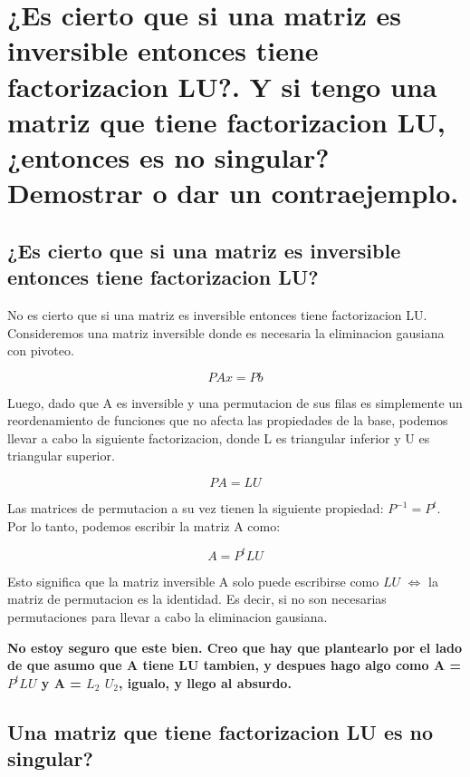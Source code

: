 \documentclass[10pt,a4paper]{article}
\begin{document}
\section{¿Es cierto que si una matriz es inversible entonces tiene factorizacion LU?. Y si tengo una matriz que tiene factorizacion LU, ¿entonces es no singular? Demostrar o dar un contraejemplo.}

\subsection{¿Es cierto que si una matriz es inversible entonces tiene factorizacion LU?}

No es cierto que si una matriz es inversible entonces tiene factorizacion LU. Consideremos una matriz inversible  donde es necesaria la eliminacion gausiana con pivoteo.

\begin{equation}
PAx = Pb
\end{equation}

Luego, dado que A es inversible y una permutacion de sus filas es simplemente un reordenamiento de funciones que no afecta las propiedades de la base, podemos llevar a cabo la siguiente factorizacion, donde L es triangular inferior y U es triangular superior.

\begin{equation}
PA = LU
\end{equation}

Las matrices de permutacion a su vez tienen la siguiente propiedad: $P^{-1} = P^t$. Por lo tanto, podemos escribir la matriz A como:

\begin{equation}
A = P^tLU
\end{equation}

Esto significa que la matriz inversible A solo puede escribirse como $LU$ $\iff$ la matriz de permutacion es la identidad. Es decir, si no son necesarias permutaciones para  llevar a cabo la eliminacion gausiana.

\textbf{No estoy seguro que este bien. Creo que hay que plantearlo por el lado de que asumo que A tiene LU tambien, y despues hago algo como A = $P^tLU$ y A = $L_2$ $U_2$, igualo, y llego al absurdo.}

\pagebreak

\subsection{Una matriz que tiene factorizacion LU es no singular?}
\end{document}
